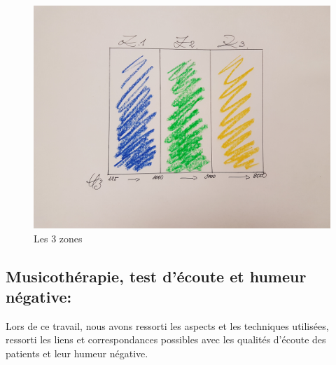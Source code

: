 \begin{figure}
	\centering
	\includegraphics[width=1\linewidth]{images/les3zones.jpg}
	\caption[Les 3 zones]{Les 3 zones}
	\label{Les trois zones du test d'écoute}
\end{figure}
 \clearpage

\subsection{Musicothérapie, test d'écoute et humeur négative:}
Lors de ce travail, nous avons ressorti les aspects 
et  les techniques utilisées, ressorti  les liens et 
correspondances possibles avec les qualités d'écoute des patients et leur humeur 
négative.  %

